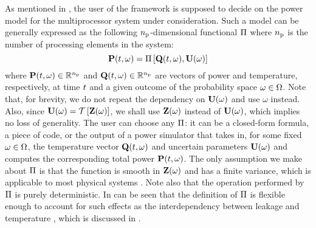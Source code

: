 As mentioned in , the user of the framework is supposed to decide on the power model for the multiprocessor system under consideration.
Such a model can be generally expressed as the following ${n_\text{p}}$-dimensional functional $\oPower$ where ${n_\text{p}}$ is the number of processing elements in the system:
\begin{equation} \elabel{power-model}
  \vP(\t, \o) = \oPower{\vTO(\t, \o), \vU(\o)}
\end{equation}
where $\mathbf{P}(t, \omega) \in \mathbb{R}^{n_\text{p}}$ and $\mathbf{Q}(t, \omega) \in \mathbb{R}^{n_\text{p}}$ are vectors of power and temperature, respectively, at time $t$ and a given outcome of the probability space $\omega \in \Omega$.
Note that, for brevity, we do not repeat the dependency on $\mathbf{U}(\omega)$ and use $\omega$ instead.
Also, since $\vU(\o) = \oTransform{\vZ(\o)}$, we shall use $\mathbf{Z}(\omega)$ instead of $\mathbf{U}(\omega)$, which implies no loss of generality.
The user can choose any $\oPower$: it can be a closed-form formula, a piece of code, or the output of a power simulator that takes in, for some fixed $\omega \in \Omega$, the temperature vector $\mathbf{Q}(t, \omega)$ and uncertain parameters $\mathbf{U}(\omega)$ and computes the corresponding total power $\mathbf{P}(t, \omega)$.
The only assumption we make about $\oPower$ is that the function is smooth in $\mathbf{Z}(\omega)$ and has a finite variance, which is applicable to most physical systems \cite{xiu2010}.
Note also that the operation performed by $\oPower$ is purely deterministic.
In can be seen that the definition of $\oPower$ is flexible enough to account for such effects as the interdependency between leakage and temperature \cite{srivastava2010, liu2007}, which is discussed in .
